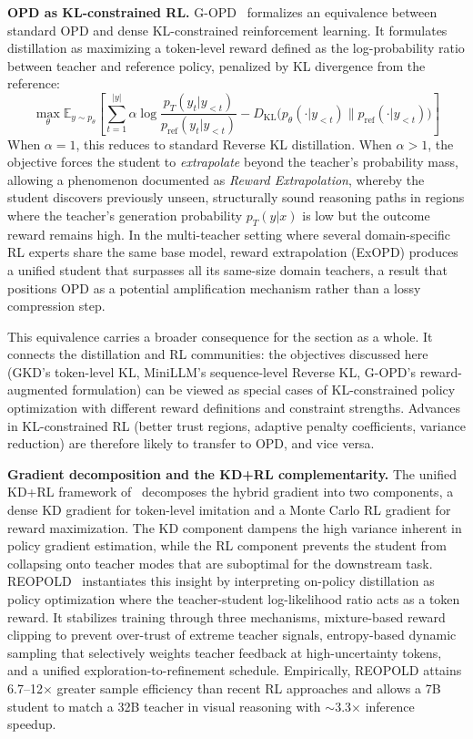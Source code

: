\documentclass{article} %
\newcommand{\E}{\mathbb{E}}
\newcommand{\KL}{D_{\mathrm{KL}}}
\newcommand{\ptheta}{p_\theta}
\newcommand{\pteacher}{p_T}
\begin{document}
\textbf{OPD as KL-constrained RL.} G-OPD~\citep{2602.12125} formalizes an equivalence between standard OPD and dense KL-constrained reinforcement learning. It formulates distillation as maximizing a token-level reward defined as the log-probability ratio between teacher and reference policy, penalized by KL divergence from the reference:
\begin{equation*}
    \max_\theta \E_{y \sim \ptheta} \left[ \sum_{t=1}^{|y|} \alpha \log \frac{\pteacher(y_t | y_{<t})}{p_{\text{ref}}(y_t | y_{<t})} - \KL\big(\ptheta(\cdot | y_{<t}) \parallel p_{\text{ref}}(\cdot | y_{<t})\big) \right]
\end{equation*}
When $\alpha = 1$, this reduces to standard Reverse KL distillation. When $\alpha > 1$, the objective forces the student to \emph{extrapolate} beyond the teacher's probability mass, allowing a phenomenon documented as \emph{Reward Extrapolation}, whereby the student discovers previously unseen, structurally sound reasoning paths in regions where the teacher's generation probability $\pteacher(y|x)$ is low but the outcome reward remains high. In the multi-teacher setting where several domain-specific RL experts share the same base model, reward extrapolation (ExOPD) produces a unified student that surpasses all its same-size domain teachers, a result that positions OPD as a potential amplification mechanism rather than a lossy compression step.

This equivalence carries a broader consequence for the section as a whole. It connects the distillation and RL communities: the objectives discussed here (GKD's token-level KL, MiniLLM's sequence-level Reverse KL, G-OPD's reward-augmented formulation) can be viewed as special cases of KL-constrained policy optimization with different reward definitions and constraint strengths. Advances in KL-constrained RL (better trust regions, adaptive penalty coefficients, variance reduction) are therefore likely to transfer to OPD, and vice versa.

\textbf{Gradient decomposition and the KD+RL complementarity.} The unified KD+RL framework of~\citet{2512.23097} decomposes the hybrid gradient into two components, a dense KD gradient for token-level imitation and a Monte Carlo RL gradient for reward maximization. The KD component dampens the high variance inherent in policy gradient estimation, while the RL component prevents the student from collapsing onto teacher modes that are suboptimal for the downstream task. REOPOLD~\citep{2603.11137} instantiates this insight by interpreting on-policy distillation as policy optimization where the teacher-student log-likelihood ratio acts as a token reward. It stabilizes training through three mechanisms, mixture-based reward clipping to prevent over-trust of extreme teacher signals, entropy-based dynamic sampling that selectively weights teacher feedback at high-uncertainty tokens, and a unified exploration-to-refinement schedule. Empirically, REOPOLD attains 6.7--12$\times$ greater sample efficiency than recent RL approaches and allows a 7B student to match a 32B teacher in visual reasoning with $\sim$3.3$\times$ inference speedup.
\end{document}
